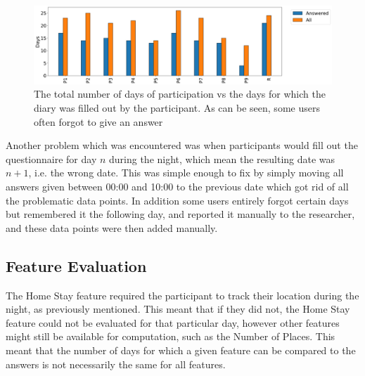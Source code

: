\begin{figure}
    \centering
    \includegraphics[width=\textwidth]{images/study/storage/answers_days_plot.png}
    \caption{The total number of days of participation vs the days for which the diary was filled out by the participant. As can be seen, some users often forgot to give an answer}
    \label{fig:plot-days-answered}
\end{figure}

Another problem which was encountered was when participants would fill out the questionnaire for day $n$ during the night, which mean the resulting date was $n+1$, i.e. the wrong date. This was simple enough to fix by simply moving all answers given between 00:00 and 10:00 to the previous date which got rid of all the problematic data points. In addition some users entirely forgot certain days but remembered it the following day, and reported it manually to the researcher, and these data points were then added manually. 

\subsection{Feature Evaluation}
The Home Stay feature required the participant to track their location during the night, as previously mentioned. This meant that if they did not, the Home Stay feature could not be evaluated for that particular day, however other features might still be available for computation, such as the Number of Places. This meant that the number of days for which a given feature can be compared to the answers is not necessarily the same for all features. 


